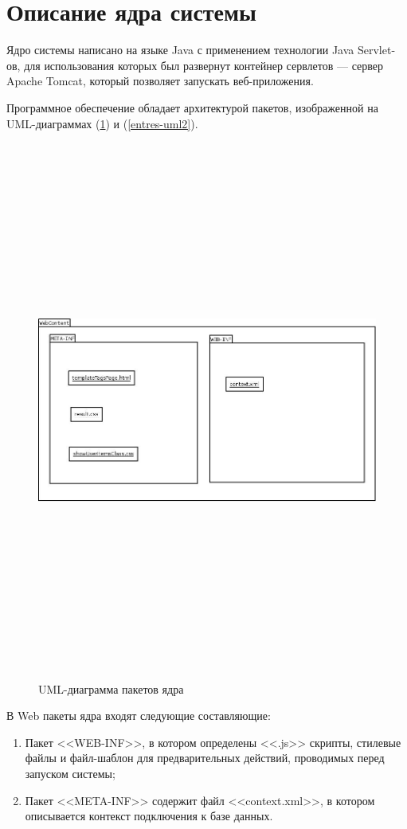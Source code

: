 \section{Описание ядра системы}
Ядро системы написано на языке Java с применением технологии Java Servlet-ов,
для использования которых был развернут контейнер сервлетов --- сервер
Apache Tomcat, который позволяет запускать веб-приложения.

Программное обеспечение обладает архитектурой пакетов, изображенной на
UML-диаграммах (\ref{entres-uml1}) и (\ref{entres-uml2}).
\begin{figure}[h]
\caption{UML-диаграмма пакетов ядра}
	\label{entres-uml1}
\begin{center}
  \includegraphics[width=7in,height=7in]{pics/core-web-content.jpeg}
\end{center}
\end{figure}
В Web пакеты ядра входят следующие составляющие:
\begin{enumerate}
\item Пакет <<WEB-INF>>, в котором определены <<.js>> скрипты, стилевые файлы и
	файл-шаблон для предварительных действий, проводимых перед запуском
		системы;
\item Пакет <<META-INF>> содержит файл <<context.xml>>,
	в котором описывается контекст подключения к базе данных.
\end{enumerate}

